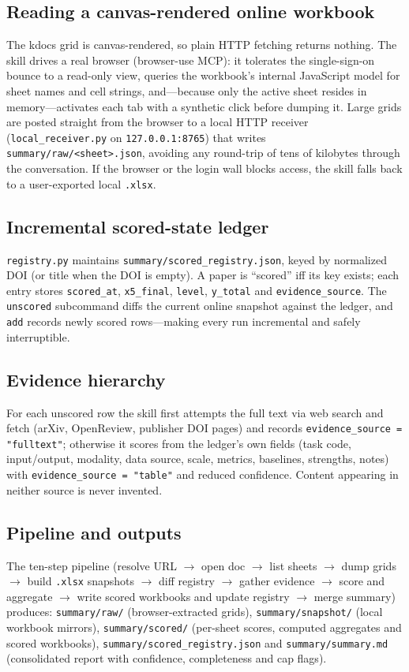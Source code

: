 \documentclass[11pt,a4paper]{article}
\begin{document}
\subsection{Reading a canvas-rendered online workbook}
The kdocs grid is canvas-rendered, so plain HTTP fetching returns nothing.
The skill drives a real browser (browser-use MCP): it tolerates the
single-sign-on bounce to a read-only view, queries the workbook's internal
JavaScript model for sheet names and cell strings, and---because only the
active sheet resides in memory---activates each tab with a synthetic click
before dumping it. Large grids are posted straight from the browser to a
local HTTP receiver (\texttt{local\_receiver.py} on \texttt{127.0.0.1:8765})
that writes \texttt{summary/raw/<sheet>.json}, avoiding any round-trip of
tens of kilobytes through the conversation. If the browser or the login wall
blocks access, the skill falls back to a user-exported local \texttt{.xlsx}.

\subsection{Incremental scored-state ledger}
\texttt{registry.py} maintains \texttt{summary/scored\_registry.json}, keyed by
normalized DOI (or title when the DOI is empty). A paper is ``scored'' iff its
key exists; each entry stores \texttt{scored\_at}, \texttt{x5\_final},
\texttt{level}, \texttt{y\_total} and \texttt{evidence\_source}. The
\texttt{unscored} subcommand diffs the current online snapshot against the
ledger, and \texttt{add} records newly scored rows---making every run
incremental and safely interruptible.

\subsection{Evidence hierarchy}
For each unscored row the skill first attempts the full text via web search
and fetch (arXiv, OpenReview, publisher DOI pages) and records
\texttt{evidence\_source = "fulltext"}; otherwise it scores from the ledger's
own fields (task code, input/output, modality, data source, scale, metrics,
baselines, strengths, notes) with
\texttt{evidence\_source = "table"} and reduced confidence. Content appearing
in neither source is never invented.

\subsection{Pipeline and outputs}
The ten-step pipeline (resolve URL $\rightarrow$ open doc $\rightarrow$ list
sheets $\rightarrow$ dump grids $\rightarrow$ build \texttt{.xlsx} snapshots
$\rightarrow$ diff registry $\rightarrow$ gather evidence $\rightarrow$ score
and aggregate $\rightarrow$ write scored workbooks and update registry
$\rightarrow$ merge summary) produces:
\texttt{summary/raw/} (browser-extracted grids), \texttt{summary/snapshot/}
(local workbook mirrors), \texttt{summary/scored/} (per-sheet scores,
computed aggregates and scored workbooks), \texttt{summary/scored\_registry.json}
and \texttt{summary/summary.md} (consolidated report with confidence,
completeness and cap flags).
\end{document}
